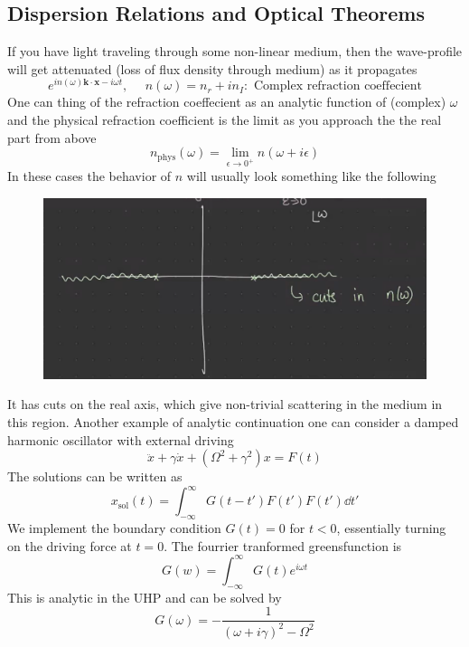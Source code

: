 \documentclass[a4paper,12pt]{article}
\begin{document}
\subsection{Dispersion Relations and Optical Theorems}
If you have light traveling through some non-linear medium, then the wave-profile will get attenuated (loss of flux density through medium) as it propagates
\begin{equation}
e^{i n(\omega)\bm k\cdot \bm x-i\omega t},~~~~~~n(\omega)=n_r+in_I: \text{ Complex refraction coeffecient}
\end{equation}
One can thing of the refraction coeffecient as an analytic function of (complex) $\omega $ and the physical refraction coefficient is the limit as you approach the the real part from above
\begin{equation}
n_{\text{phys}}(\omega )=\lim_{\epsilon\to 0^+}n(\omega +i\epsilon)
\end{equation}
In these cases the behavior of $n$ will usually look something like the following
\begin{figure}[H]
	\centering
	\includegraphics[width=0.5\linewidth]{22}
	\caption{}
	\label{fig:4}
\end{figure}
It has cuts on the real axis, which give non-trivial scattering in the medium in this region.
Another example of analytic continuation one can consider a damped harmonic oscillator with external driving
\begin{equation}
\ddot{x}+\gamma \dot{x}+(\Omega^2+\gamma^2)x=F(t)
\end{equation}
The solutions can be written as
\begin{equation}
x_{\text{sol}}(t)=\int_{-\infty}^{\infty}G(t-t')F(t')F(t')\dd t'
\end{equation}
We implement the boundary condition $G(t)=0$ for $t<0$, essentially turning on the driving force at $t=0$. The fourrier tranformed greensfunction is
\begin{equation}
G(w)=\int_{-\infty}^{\infty}G(t)e^{i\omega t}
\end{equation}
This is analytic in the UHP and can be solved by
\begin{equation}
G(\omega)=-\frac{1}{(\omega+i\gamma)^2-\Omega^2}
\end{equation}
\end{document}

